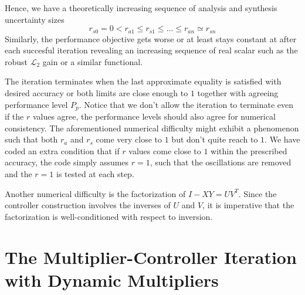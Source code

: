 Hence, we have a theoretically increasing sequence of analysis and synthesis uncertainty sizes 
\[
r_{s0} = 0< r_{a1} \leq r_{s1} \leq \ldots \leq r_{an} \simeq r_{sn}
\]
Similarly, the performance objective gets worse or at least stays constant at after each succesful iteration
revealing an increasing sequence of real scalar such as the robust $\mathcal{L}_2$ gain or a similar 
functional. 

The iteration terminates when the last approximate equality is satisfied with desired accuracy or both limits 
are close enough to $1$ together with agreeing performance level $P_p$. Notice that we don't allow the iteration
to terminate even if the $r$ values agree, the performance levels should also agree for numerical consistency. The 
aforementioned numerical difficulty might exhibit a phenomenon such that both $r_{a}$ and $r_{s}$ come very close 
to $1$ but don't quite reach to $1$. We have coded an extra condition that if $r$ values come close to $1$ within 
the prescribed accuracy, the code simply assumes $r=1$, such that the oscillations are removed and the $r=1$ is 
tested at each step. 


Another numerical difficulty is the factorization of $I-XY=UV^T$. Since the controller construction involves the 
inverses of $U$ and $V$, it is imperative that the factorization is well-conditioned with respect to inversion.





\section{The Multiplier-Controller Iteration with Dynamic Multipliers}


